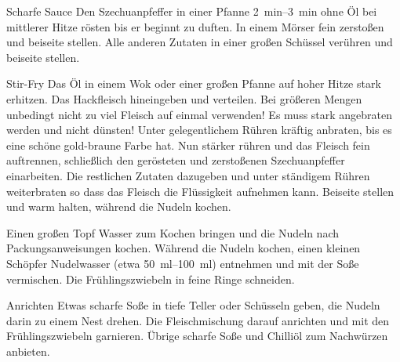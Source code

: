 \begin{recipestep}{Scharfe Sauce}
  Den Szechuanpfeffer in einer Pfanne \SIrange{2}{3}{\minute} ohne Öl bei mittlerer Hitze rösten bis er beginnt zu duften.
  In einem Mörser fein zerstoßen und beiseite stellen. Alle anderen Zutaten in einer großen Schüssel verühren und beiseite stellen.
\end{recipestep}

\begin{recipestep}{Stir-Fry}
  Das Öl in einem Wok oder einer großen Pfanne auf hoher Hitze stark erhitzen. Das Hackfleisch hineingeben und verteilen.
  Bei größeren Mengen unbedingt nicht zu viel Fleisch auf einmal verwenden! Es muss stark angebraten werden und nicht dünsten!
  Unter gelegentlichem Rühren kräftig anbraten, bis es eine schöne gold-braune Farbe hat. Nun stärker rühren und das Fleisch fein
  auftrennen, schließlich den gerösteten und zerstoßenen Szechuanpfeffer einarbeiten. Die restlichen Zutaten dazugeben und unter
  ständigem Rühren weiterbraten so dass das Fleisch die Flüssigkeit aufnehmen kann. Beiseite stellen und warm halten, während die Nudeln kochen.

  Einen großen Topf Wasser zum Kochen bringen und die Nudeln nach Packungsanweisungen kochen. Während die Nudeln kochen, einen kleinen Schöpfer
  Nudelwasser (etwa \SIrange{50}{100}{\milli\litre}) entnehmen und mit der Soße vermischen. Die Frühlingszwiebeln in feine Ringe schneiden.
\end{recipestep}

\begin{recipestep}{Anrichten}
  Etwas scharfe Soße in tiefe Teller oder Schüsseln geben, die Nudeln darin zu einem Nest drehen.
  Die Fleischmischung darauf anrichten und mit den Frühlingszwiebeln garnieren. Übrige scharfe Soße und Chilliöl
  zum Nachwürzen anbieten.
\end{recipestep}
